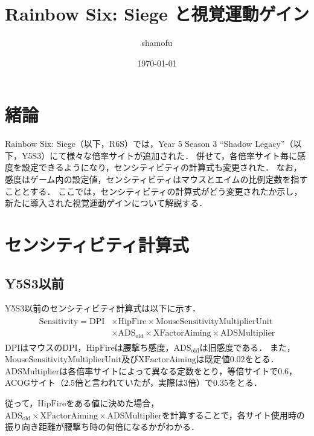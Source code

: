 \documentclass[uplatex, dvipdfmx, ja=standard, a4paper]{bxjsarticle}
\title{Rainbow Six: Siege と視覚運動ゲイン}
\author{shamofu}
\date{\today}
\begin{document}
\maketitle

\section{緒論}
Rainbow Six: Siege（以下，R6S）では，Year 5 Season 3 ``Shadow Legacy''（以下，Y5S3）にて様々な倍率サイトが追加された．
併せて，各倍率サイト毎に感度を設定できるようになり，センシティビティの計算式も変更された．
なお，感度はゲーム内の設定値，センシティビティはマウスとエイムの比例定数を指すこととする．
ここでは，センシティビティの計算式がどう変更されたか示し，新たに導入された視覚運動ゲインについて解説する．

\section{センシティビティ計算式}
\subsection{Y5S3以前}
Y5S3以前のセンシティビティ計算式は以下に示す．
\begin{align}
  \begin{split}
    \mathrm{Sensitivity} = \mathrm{DPI} &\times \mathrm{HipFire} \times \mathrm{MouseSensitivityMultiplierUnit} \\
    &\times \mathrm{ADS}_{\mathrm{old}} \times \mathrm{XFactorAiming} \times \mathrm{ADSMultiplier}
  \end{split}
  \label{oldsensi}
\end{align}
\(\mathrm{DPI}\)はマウスのDPI，\(\mathrm{HipFire}\)は腰撃ち感度，\(\mathrm{ADS}_{\mathrm{old}}\)は旧感度である．
また，\(\mathrm{MouseSensitivityMultiplierUnit}\)及び\(\mathrm{XFactorAiming}\)は既定値\(0.02\)をとる．
\(\mathrm{ADSMultiplier}\)は各倍率サイトによって異なる定数をとり，等倍サイトで\(0.6\)，ACOGサイト（2.5倍と言われていたが，実際は3倍）で\(0.35\)をとる．

従って，\(\mathrm{HipFire}\)をある値に決めた場合，\(\mathrm{ADS}_{\mathrm{old}} \times \mathrm{XFactorAiming} \times \mathrm{ADSMultiplier}\)を計算することで，各サイト使用時の振り向き距離が腰撃ち時の何倍になるかがわかる．
\end{document}

